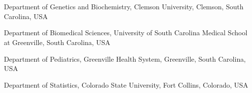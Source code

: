 \documentclass[landscape,twocolum,letterpaper]{article}
\begin{document}
\center
\fontsize{18}{18}\\
\fontsize{8}{8}\\
\centering
\begin{compactenum}
	\item Department of Genetics and Biochemistry, Clemson University, Clemson, South Carolina, USA
	\item Department of Biomedical Sciences, University of South Carolina Medical School at Greenville, South Carolina, USA
	\item Department of Pediatrics, Greenville Health System, Greenville, South Carolina, USA
	\item Department of Statistics, Colorado State University, Fort Collins, Colorado, USA
\end{compactenum}
\end{document}
